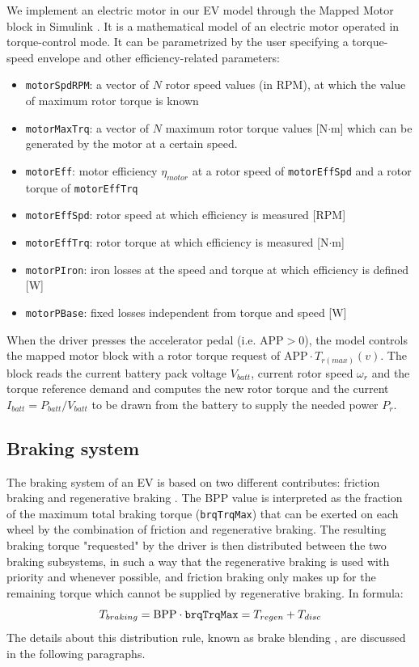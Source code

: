 We implement an electric motor in our EV model through the Mapped Motor block in Simulink \cite{mathworks:mapped_motor}. It is a mathematical model of an electric motor operated in torque-control mode. It can be parametrized by the user specifying a torque-speed envelope and other efficiency-related parameters:
\begin{itemize}
    \item \texttt{motorSpdRPM}: a vector of $N$ rotor speed values (in RPM), at which the value of maximum rotor torque is known
    \item \texttt{motorMaxTrq}: a vector of $N$ maximum rotor torque values [N$\cdot$m] which can be generated by the motor at a certain speed.
    \item \texttt{motorEff}: motor efficiency $\eta_{motor}$ at a rotor speed of \texttt{motorEffSpd} and a rotor torque of \texttt{motorEffTrq}
    \item \texttt{motorEffSpd}: rotor speed at which efficiency is measured [RPM]
    \item \texttt{motorEffTrq}: rotor torque at which efficiency is measured [N$\cdot$m]
    \item \texttt{motorPIron}: iron losses at the speed and torque at which efficiency is defined [W]
    \item \texttt{motorPBase}: fixed losses independent from torque and speed [W]
\end{itemize}

When the driver presses the accelerator pedal (i.e. $\text{APP}>0$), the model controls the mapped motor block with a rotor torque request of $\text{APP}\cdot T_{r(max)}(v)$. The block reads the current battery pack voltage $V_{batt}$, current rotor speed $\omega_r$ and the torque reference demand and computes the new rotor torque and the current $I_{batt}=P_{batt}/V_{batt}$ to be drawn from the battery to supply the needed power $P_r$.



\subsection{Braking system}
\label{sec:braking}
The braking system of an EV is based on two different contributes: friction braking and regenerative braking \cite{hayes_ev_book}.
The BPP value is interpreted as the fraction of the maximum total braking torque (\texttt{brqTrqMax}) that can be exerted on each wheel by the combination of friction and regenerative braking. The resulting braking torque "requested" by the driver is then distributed between the two braking subsystems, in such a way that the regenerative braking is used with priority and whenever possible, and friction braking only makes up for the remaining torque which cannot be supplied by regenerative braking. In formula:
\[
T_{braking} = \text{BPP} \cdot \text{\texttt{brqTrqMax}} = T_{regen} + T_{disc}
\]
The details about this distribution rule, known as brake blending \cite{brake_blending}, are discussed in the following paragraphs.

